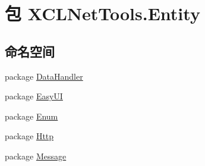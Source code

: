\hypertarget{namespace_x_c_l_net_tools_1_1_entity}{\section{包 X\-C\-L\-Net\-Tools.\-Entity}
\label{namespace_x_c_l_net_tools_1_1_entity}
}
\subsection*{命名空间}
\begin{DoxyCompactItemize}
\item 
package \hyperlink{namespace_x_c_l_net_tools_1_1_entity_1_1_data_handler}{Data\-Handler}
\item 
package \hyperlink{namespace_x_c_l_net_tools_1_1_entity_1_1_easy_u_i}{Easy\-U\-I}
\item 
package \hyperlink{namespace_x_c_l_net_tools_1_1_entity_1_1_enum}{Enum}
\item 
package \hyperlink{namespace_x_c_l_net_tools_1_1_entity_1_1_http}{Http}
\item 
package \hyperlink{namespace_x_c_l_net_tools_1_1_entity_1_1_message}{Message}
\end{DoxyCompactItemize}
